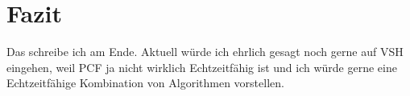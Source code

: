 \chapter{Fazit}
Das schreibe ich am Ende. Aktuell würde ich ehrlich gesagt noch gerne auf VSH eingehen,
weil PCF ja nicht wirklich Echtzeitfähig ist und
ich würde gerne eine Echtzeitfähige Kombination von Algorithmen vorstellen.

















